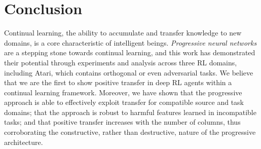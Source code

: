 \section{Conclusion}

Continual learning, the ability to accumulate and transfer knowledge to new domains, is a core characteristic of intelligent beings. \textit{Progressive neural networks} are a stepping stone towards continual learning, and this work has demonstrated their potential through experiments and analysis across three RL domains, including Atari, which contains orthogonal or even adversarial tasks. We believe that we are the first to show positive transfer in deep RL agents within a continual learning framework. Moreover, we have shown that the progressive approach is able to effectively exploit transfer for compatible source and task domains; that the approach is robust to harmful features learned in incompatible tasks; and that positive transfer increases with the number of columns, thus corroborating the constructive, rather than destructive, nature of the progressive architecture.
